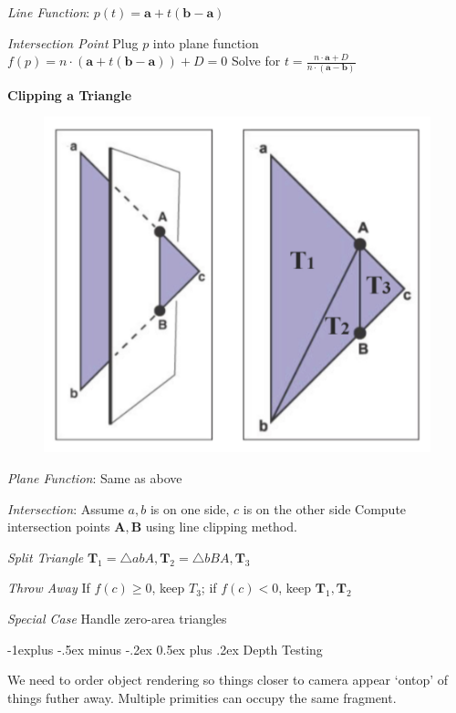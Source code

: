 \documentclass[letterpaper, 8pt]{extarticle}
\makeatletter
\renewcommand{\section}{\@startsection{section}{1}{0mm}%
                                {-1explus -.5ex minus -.2ex}%
                                {0.5ex plus .2ex}%
                                {\normalfont\small\bfseries}}
\makeatother
\begin{document}
\begin{multicols*}{4}
\textit{Line Function}:
\(p(t) = \mathbf{a} + t (\mathbf{b} - \mathbf{a})\)

\textit{Intersection Point}
Plug \(p\) into plane function \(f(p) = n \cdot (\mathbf{a} + t(\mathbf{b} - \mathbf{a})) + D = 0\)
Solve for \(t = \frac{n \cdot \textbf{a} + D}{n \cdot (\textbf{a} - \textbf{b})}\)

\textbf{Clipping a Triangle}
\begin{figure}[!ht]
    \includegraphics[width=\linewidth]{triangle-clipping.png}
\end{figure}

\textit{Plane Function}:
Same as above

\textit{Intersection}:
Assume \(a, b\) is on one side, \(c\) is on the other side
Compute intersection points \(\mathbf{A}, \mathbf{B}\) using line clipping method.

\textit{Split Triangle}
\(\mathbf{T}_1=\triangle abA, \mathbf{T}_2=\triangle bBA, \mathbf{T}_3\)

\textit{Throw Away}
If \(f(c) \geq 0\), keep \(T_3\); if \(f(c) < 0\), keep \(\mathbf{T}_1, \mathbf{T}_2\)

\textit{Special Case}
Handle zero-area triangles

\section{Depth Testing}

We need to order object rendering so things closer to camera appear `ontop' of things futher away.
Multiple primities can occupy the same fragment.


\end{multicols*}
\end{document}
